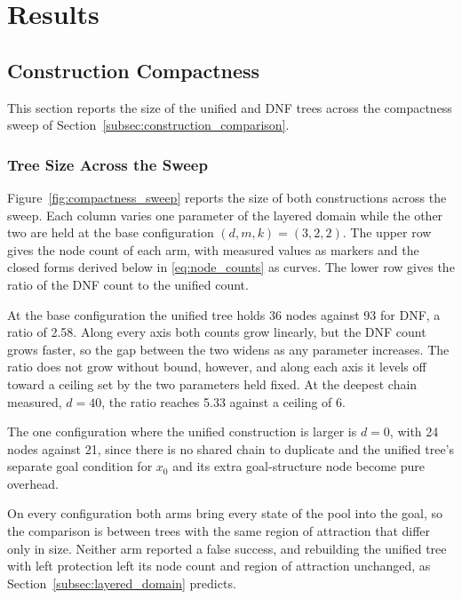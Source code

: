 \chapter{Results}
\label{ch:results}
\section{Construction Compactness}
\label{sec:results_compactness}
    This section reports the size of the unified and DNF trees across the compactness sweep of Section~\ref{subsec:construction_comparison}.

    

    \subsection{Tree Size Across the Sweep}
    \label{subsec:compactness_sweep_results}
    Figure~\ref{fig:compactness_sweep} reports the size of both constructions across the sweep.
    Each column varies one parameter of the layered domain while the other two are held at the base configuration $(d, m, k) = (3, 2, 2)$.
    The upper row gives the node count of each arm, with measured values as markers and the closed forms derived below in \eqref{eq:node_counts} as curves.
    The lower row gives the ratio of the DNF count to the unified count.

    At the base configuration the unified tree holds 36 nodes against 93 for DNF, a ratio of 2.58.
    Along every axis both counts grow linearly, but the DNF count grows faster, so the gap between the two widens as any parameter increases.
    The ratio does not grow without bound, however, and along each axis it levels off toward a ceiling set by the two parameters held fixed.
    At the deepest chain measured, $d = 40$, the ratio reaches 5.33 against a ceiling of 6.
    
    The one configuration where the unified construction is larger is $d = 0$, with 24 nodes against 21, since there is no shared chain to duplicate and the unified tree's separate goal condition for $x_0$ and its extra goal-structure node become pure overhead.
    
    On every configuration both arms bring every state of the pool into the goal, so the comparison is between trees with the same region of attraction that differ only in size.
    Neither arm reported a false success, and rebuilding the unified tree with left protection left its node count and region of attraction unchanged, as Section~\ref{subsec:layered_domain} predicts.


